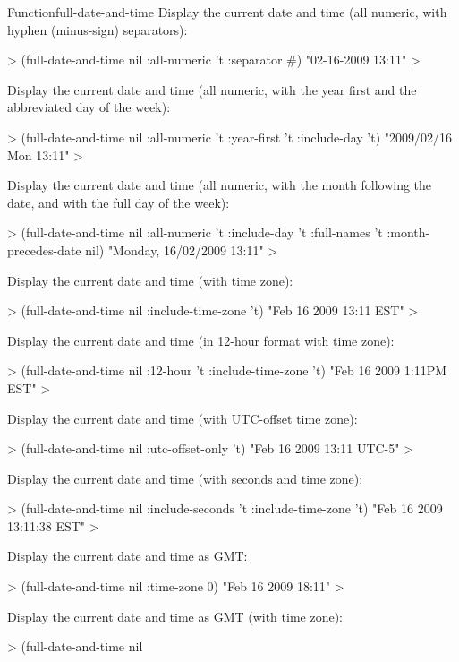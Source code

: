 \documentclass[10pt,twoside,english,pdftex]{article}
\begin{document}
\begin{functiondoc}{Function}{full-date-and-time}
%
Display the current date and time (all numeric, with hyphen (minus-sign)
separators):
%
\W\supp\notpretop
\begin{example}
  > (full-date-and-time nil :all-numeric 't :separator #\-)
  "02-16-2009 13:11"
  >
\end{example}
%
Display the current date and time (all numeric, with the year first and the
abbreviated day of the week):
%
\W\supp\notpretop
\begin{example}
  > (full-date-and-time nil :all-numeric 't :year-first 't :include-day 't)
  "2009/02/16 Mon 13:11"
  >
\end{example}
%
Display the current date and time (all numeric, with the month following the
date, and with the full day of the week):
%
\W\supp\notpretop
\begin{example}
  > (full-date-and-time nil :all-numeric 't :include-day 't 
                            :full-names 't :month-precedes-date nil)
  "Monday, 16/02/2009 13:11"
  >
\end{example}
%
Display the current date and time (with time zone):
%
\W\supp\notpretop
\begin{example}
  > (full-date-and-time nil :include-time-zone 't)
  "Feb 16 2009 13:11 EST"
  >
\end{example}
%
Display the current date and time (in 12-hour format with time zone):
%
\W\supp\notpretop
\begin{example}
  > (full-date-and-time nil :12-hour 't :include-time-zone 't)
  "Feb 16 2009 1:11PM EST"
  >
\end{example}
%
Display the current date and time (with UTC-offset time zone):
%
\W\supp\notpretop
\begin{example}
  > (full-date-and-time nil :utc-offset-only 't)
  "Feb 16 2009 13:11 UTC-5"
  >
\end{example}
%
Display the current date and time (with seconds and time zone):
%
\W\supp\notpretop
\begin{example}
  > (full-date-and-time nil
      :include-seconds 't 
      :include-time-zone 't)
  "Feb 16 2009 13:11:38 EST"
  >
\end{example}
%
Display the current date and time as GMT: 
%
\W\supp\notpretop
\begin{example}
  > (full-date-and-time nil :time-zone 0)
  "Feb 16 2009 18:11"
  >
\end{example}
Display the current date and time as GMT (with time zone):
%
\W\supp\notpretop
\begin{example}
  > (full-date-and-time nil 

\end{example}
\end{functiondoc}
\end{document}
